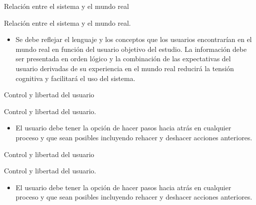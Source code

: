 \documentclass[aspectratio=169]{beamer}
\begin{document}
\begin{frame}{Relación entre el sistema y el mundo real}
  
  \begin{block}{Relación entre el sistema y el mundo real.}
  \begin{itemize}    
    \item Se debe reflejar el lenguaje y los conceptos que los usuarios encontrarían en el mundo real en función del usuario objetivo del estudio. La información debe ser presentada en orden lógico y la combinación de las expectativas del usuario derivadas de su experiencia en el mundo real reducirá la tensión cognitiva y facilitará el uso del sistema.

  \end{itemize}
  \end{block}

\end{frame}

  
\begin{frame}{Control y libertad del usuario}
  
  \begin{block}{Control y libertad del usuario.}
  \begin{itemize}    
    \item El usuario debe tener la opción de hacer pasos hacia atrás en cualquier proceso y que sean posibles incluyendo rehacer y deshacer acciones anteriores.

  \end{itemize}
  \end{block}

\end{frame}

\begin{frame}{Control y libertad del usuario}
  
  \begin{block}{Control y libertad del usuario.}
  \begin{itemize}    
    \item El usuario debe tener la opción de hacer pasos hacia atrás en cualquier proceso y que sean posibles incluyendo rehacer y deshacer acciones anteriores.

  \end{itemize}
  \end{block}

\end{frame}
\end{document}
